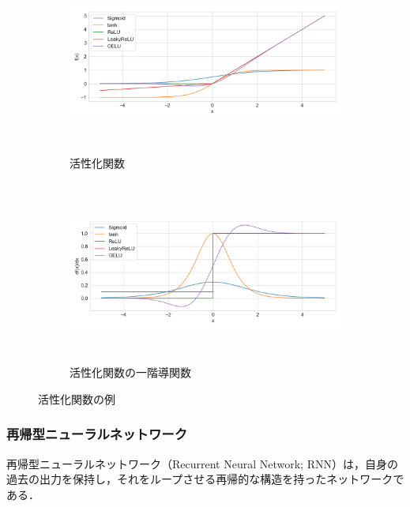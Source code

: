 \documentclass[12pt]{jarticle}
\numberwithin{equation}{section}    %
\numberwithin{figure}{section}      %
\numberwithin{table}{section}      %
\begin{document}
\begin{figure}[tb]
    \centering
    \begin{subfigure}[b]{1.0\textwidth}
        \centering
        \includegraphics[height=6cm]{./figure/sec3/activations.png}
        \caption{活性化関数}
        \label{sec3:fig:activations}
    \end{subfigure}
    \begin{subfigure}[b]{1.0\textwidth}
        \centering
        \includegraphics[height=6cm]{./figure/sec3/activations_prime.png}
        \caption{活性化関数の一階導関数}
        \label{sec3:fig:activations_prime}
    \end{subfigure}
    \caption{活性化関数の例}
    \label{sec3:fig:activations_and_their_prime}
\end{figure}

\subsubsection{再帰型ニューラルネットワーク}
再帰型ニューラルネットワーク（Recurrent Neural Network; RNN）は，自身の過去の出力を保持し，それをループさせる再帰的な構造を持ったネットワークである．
\end{document}
